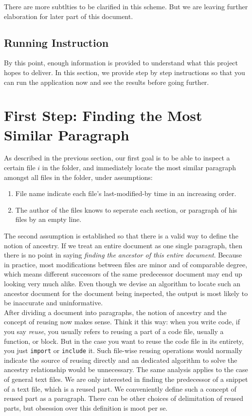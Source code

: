 \documentclass{article}
\begin{document}
There are more subtlties to be clarified in this scheme. But we are leaving further elaboration for later part of this document. 

\subsection{Running Instruction}
By this point, enough information is provided to understand what this project hopes to deliver. In this section, we provide step by step instructions so that you can run the application now and see the results before going further. 

\section{First Step: Finding the Most Similar Paragraph}
As described in the previous section, our first goal is to be able to inspect a certain file $i$ in the folder, and immediately locate the most similar paragraph amongst all files in the folder, under assumptions:
\begin{enumerate}
  \item File name indicate each file's last-modified-by time in an increasing order.
  \item The author of the files knows to seperate each section, or paragraph of his files by an empty line. 
\end{enumerate}

The second assumption is established so that there is a valid way to define the notion of ancestry. If we treat an entire document as one single paragraph, then there is no point in saying \textit{finding the ancestor of this entire document}. Because in practice, most modifications between files are minor and of comparable degree, which means different successors of the same predecessor document may end up looking very much alike. Even though we devise an algorithm to locate such an ancestor document for the document being inspected, the output is most likely to be inaccurate and uninformative. \\

After dividing a document into paragraphs, the notion of ancestry and the concept of reusing now makes sense. Think it this way: when you write code, if you say \textit{reuse}, you usually refers to reusing a part of a code file, usually a function, or block. But in the case you want to reuse the code file in its entirety, you just \texttt{import} or \texttt{include} it. Such file-wise reusing operations would normally indicate the source of reusing directly and an dedicated algorithm to solve the ancestry relationship would be unnecessary. The same analysis applies to the case of general text files. We are only interested in finding the predecessor of a snippet of a text file, which is a reused part. We conveniently define such a concept of reused part as a paragraph. There can be other choices of delimitation of reused parts, but obsession over this definition is moot per se. \\
\end{document}
